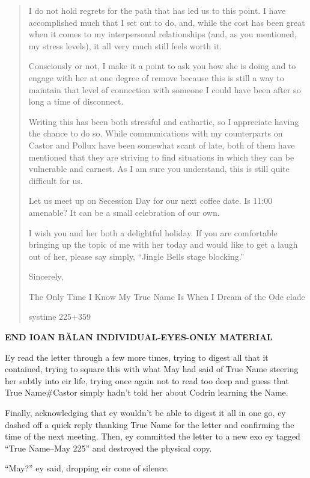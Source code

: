 \begin{quote}
I do not hold regrets for the path that has led us to this point. I have accomplished much that I set out to do, and, while the cost has been great when it comes to my interpersonal relationships (and, as you mentioned, my stress levels), it all very much still feels worth it.

Consciously or not, I make it a point to ask you how she is doing and to engage with her at one degree of remove because this is still a way to maintain that level of connection with someone I could have been after so long a time of disconnect.

Writing this has been both stressful and cathartic, so I appreciate having the chance to do so. While communications with my counterparts on Castor and Pollux have been somewhat scant of late, both of them have mentioned that they are striving to find situations in which they can be vulnerable and earnest. As I am sure you understand, this is still quite difficult for us.

Let us meet up on Secession Day for our next coffee date. Is 11:00 amenable? It can be a small celebration of our own.

I wish you and her both a delightful holiday. If you are comfortable bringing up the topic of me with her today and would like to get a laugh out of her, please say simply, ``Jingle Bells stage blocking.''

Sincerely,

The Only Time I Know My True Name Is When I Dream of the Ode clade

systime 225+359
\end{quote}

\begin{center}
\textbf{END IOAN BĂLAN INDIVIDUAL-EYES-ONLY MATERIAL}
\end{center}

Ey read the letter through a few more times, trying to digest all that it contained, trying to square this with what May had said of True Name steering her subtly into eir life, trying once again not to read too deep and guess that True Name\#Castor simply hadn't told her about Codrin learning the Name.

Finally, acknowledging that ey wouldn't be able to digest it all in one go, ey dashed off a quick reply thanking True Name for the letter and confirming the time of the next meeting. Then, ey committed the letter to a new exo ey tagged ``True Name--May 225'' and destroyed the physical copy.

``May?'' ey said, dropping eir cone of silence.

